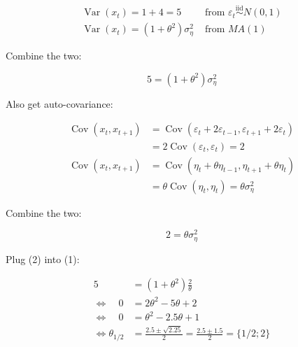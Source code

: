 {{\begin{enumerate}[label=(\alph*)]
{\item 

$$
\begin{aligned}
    \operatorname{Var}\left(x_{t}\right)=1+4=5 &\text{ from } \varepsilon_{t} \stackrel{\text{iid}}{\sim} N(0,1) \\
    \operatorname{Var} \left(x_{t}\right) =\left(1+\theta^{2}\right) \sigma_{\eta}^{2} &\text{ from } M A(1)
\end{aligned}
$$

Combine the two:

\begin{equation*}
5=\left(1+\theta^{2}\right) \sigma_{\eta}^{2} \tag{1}
\end{equation*}

Also get auto-covariance:

$$
\begin{aligned}
\operatorname{Cov}\left(x_{t}, x_{t+1}\right) & =\operatorname{Cov}\left(\varepsilon_{t}+2 \varepsilon_{t-1}, \varepsilon_{t+1}+2 \varepsilon_{t}\right) \\
& =2 \operatorname{Cov}\left(\varepsilon_{t}, \varepsilon_{t}\right)=2 \\
\operatorname{Cov}\left(x_{t}, x_{t+1}\right) & =\operatorname{Cov}\left(\eta_{t}+\theta \eta_{t-1}, \eta_{t+1}+\theta \eta_{t}\right) \\
& =\theta \operatorname{Cov}\left(\eta_{t}, \eta_{t}\right)=\theta \sigma_{\eta}^{2}
\end{aligned}
$$

Combine the two:

\begin{equation*}
2=\theta \sigma_{\eta}^{2} \tag{2}
\end{equation*}

Plug (2) into (1):

$$
\begin{aligned}
5 &= \left(1+\theta^{2}\right) \frac{2}{\theta} \\
\Leftrightarrow \quad 0 &= 2 \theta^{2}-5 \theta+2 \\
\Leftrightarrow \quad 0 &= \theta^{2}-2.5 \theta+1 \\
\Leftrightarrow \theta_{1 / 2} &= \frac{2.5 \pm \sqrt{2.25}}{2}=\frac{2.5 \pm 1.5}{2}=\{1 / 2 ; 2\}
\end{aligned}
$$

}
\end{enumerate}}}
